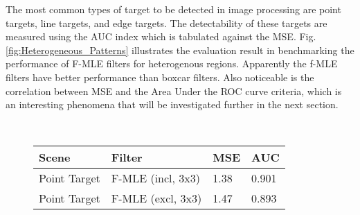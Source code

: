 The most common types of target to be detected in image processing are point targets, line targets, and edge targets.
The detectability of these targets are measured using the AUC index which is tabulated against the MSE.
Fig. \ref{fig:Heterogeneous_Patterns} illustrates the evaluation result in benchmarking the performance of F-MLE filters for heterogenous regions.
Apparently the f-MLE filters have better performance than boxcar filters.
Also noticeable is the correlation between MSE and the Area Under the ROC curve criteria, 
  which is an interesting phenomena that will be investigated further in the next section.

\begin{figure}[h!]
\begin{minipage}[c]{0.48\textwidth}
	\\
\end{minipage}
\begin{minipage}[c]{0.4\textwidth}
  \footnotesize
\begin{tabular}{|l|l|l|l|}
\hline
Scene 				& Filter 						& MSE 	& AUC \\
\hline
Point Target 	& F-MLE (incl, 3x3) 	& 1.38	& 0.901 \\
Point Target 	& F-MLE (excl, 3x3) 	& 1.47	& 0.893 \\

\end{tabular}
\end{minipage}
\end{figure}
